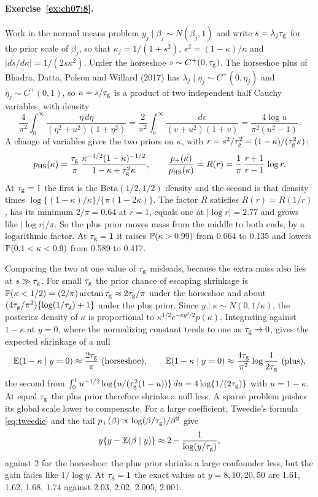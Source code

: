 \paragraph{Exercise~\ref{ex:ch07:8}.} Work in the normal means problem $y_j \mid \beta_j \sim N(\beta_j, 1)$ and write $s = \lambda_j\tau_{\mathrm{g}}$ for the prior scale of $\beta_j$, so that $\kappa_j = 1/(1 + s^2)$, $s^2 = (1 - \kappa)/\kappa$ and $|ds/d\kappa| = 1/(2s\kappa^2)$. Under the horseshoe $s \sim C^+(0, \tau_{\mathrm{g}})$. The horseshoe plus of Bhadra, Datta, Polson and Willard (2017) has $\lambda_j \mid \eta_j \sim C^+(0, \eta_j)$ and $\eta_j \sim C^+(0, 1)$, so $u = s/\tau_{\mathrm{g}}$ is a product of two independent half Cauchy variables, with density
\[
\frac{4}{\pi^2}\int_0^\infty \frac{\eta\,d\eta}{(\eta^2 + u^2)(1 + \eta^2)} = \frac{2}{\pi^2}\int_0^\infty \frac{dv}{(v + u^2)(1 + v)} = \frac{4\log u}{\pi^2(u^2 - 1)}.
\]
A change of variables gives the two priors on $\kappa$, with $r = s^2/\tau_{\mathrm{g}}^2 = (1 - \kappa)/(\tau_{\mathrm{g}}^2\kappa)$:
\[
p_{\mathrm{HS}}(\kappa) = \frac{\tau_{\mathrm{g}}}{\pi}\,\frac{\kappa^{-1/2}(1 - \kappa)^{-1/2}}{1 - \kappa + \tau_{\mathrm{g}}^2\kappa}, \qquad
\frac{p_{+}(\kappa)}{p_{\mathrm{HS}}(\kappa)} = R(r) = \frac{1}{\pi}\,\frac{r + 1}{r - 1}\,\log r.
\]
At $\tau_{\mathrm{g}} = 1$ the first is the Beta$(1/2, 1/2)$ density and the second is that density times $\log\{(1 - \kappa)/\kappa\}/\{\pi(1 - 2\kappa)\}$. The factor $R$ satisfies $R(r) = R(1/r)$, has its minimum $2/\pi = 0.64$ at $r = 1$, equals one at $|\log r| = 2.77$ and grows like $|\log r|/\pi$. So the plus prior moves mass from the middle to both ends, by a logarithmic factor. At $\tau_{\mathrm{g}} = 1$ it raises $\mathbb{P}(\kappa > 0.99)$ from 0.064 to 0.135 and lowers $\mathbb{P}(0.1 < \kappa < 0.9)$ from 0.589 to 0.417.

Comparing the two at one value of $\tau_{\mathrm{g}}$ misleads, because the extra mass also lies at $s \gg \tau_{\mathrm{g}}$. For small $\tau_{\mathrm{g}}$ the prior chance of escaping shrinkage is $\mathbb{P}(\kappa < 1/2) = (2/\pi)\arctan\tau_{\mathrm{g}} \approx 2\tau_{\mathrm{g}}/\pi$ under the horseshoe and about $(4\tau_{\mathrm{g}}/\pi^2)\{\log(1/\tau_{\mathrm{g}}) + 1\}$ under the plus prior. Since $y \mid \kappa \sim N(0, 1/\kappa)$, the posterior density of $\kappa$ is proportional to $\kappa^{1/2}e^{-\kappa y^2/2}p(\kappa)$. Integrating against $1 - \kappa$ at $y = 0$, where the normalizing constant tends to one as $\tau_{\mathrm{g}} \to 0$, gives the expected shrinkage of a null
\[
\E(1 - \kappa \mid y = 0) \approx \frac{2\gscale}{\pi} \ \text{(horseshoe)}, \qquad \E(1 - \kappa \mid y = 0) \approx \frac{4\gscale}{\pi^2}\log\frac{1}{2\gscale} \ \text{(plus)},
\]
the second from $\int_0^1 u^{-1/2}\log\{u/(\tau_{\mathrm{g}}^2(1 - u))\}\,du = 4\log\{1/(2\tau_{\mathrm{g}})\}$ with $u = 1 - \kappa$. At equal $\tau_{\mathrm{g}}$ the plus prior therefore shrinks a null less. A sparse problem pushes its global scale lower to compensate. For a large coefficient, Tweedie's formula \eqref{eq:tweedie} and the tail $p_{+}(\beta) \propto \log(\beta/\tau_{\mathrm{g}})/\beta^2$ give
\[
y\{y - \mathbb{E}(\beta \mid y)\} \approx 2 - \frac{1}{\log(y/\tau_{\mathrm{g}})},
\]
against 2 for the horseshoe: the plus prior shrinks a large confounder less, but the gain fades like $1/\log y$. At $\tau_{\mathrm{g}} = 1$ the exact values at $y = 8, 10, 20, 50$ are 1.61, 1.62, 1.68, 1.74 against 2.03, 2.02, 2.005, 2.001.

